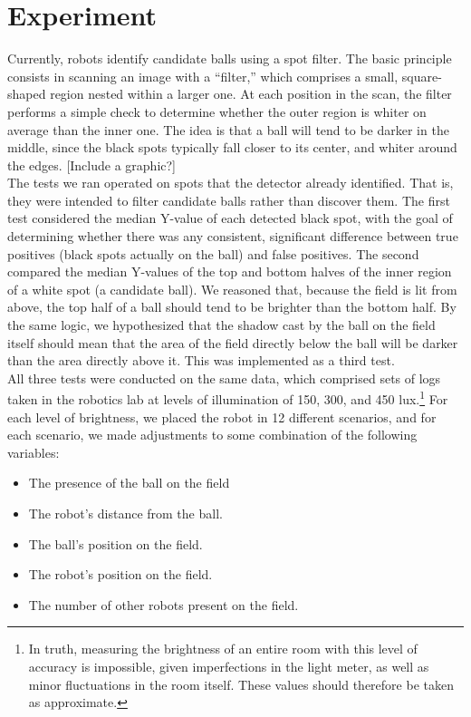 \documentclass[11pt, twocolumn]{article}
\begin{document}
\section{Experiment}
Currently, robots identify candidate balls using a spot filter. The basic principle consists in scanning an image with a ``filter,'' which comprises a small, square-shaped region nested within a larger one. At each position in the scan, the filter performs a simple check to determine whether the outer region is whiter on average than the inner one. The idea is that a ball will tend to be darker in the middle, since the black spots typically fall closer to its center, and whiter around the edges. [Include a graphic?] \\
The tests we ran operated on spots that the detector already identified. That is, they were intended to filter candidate balls rather than discover them. The first test considered the median Y-value of each detected black spot, with the goal of determining whether there was any consistent, significant difference between true positives (black spots actually on the ball) and false positives. The second compared the median Y-values of the top and bottom halves of the inner region of a white spot (a candidate ball). We reasoned that, because the field is lit from above, the top half of a ball should tend to be brighter than the bottom half. By the same logic, we hypothesized that the shadow cast by the ball on the field itself should mean that the area of the field directly below the ball will be darker than the area directly above it. This was implemented as a third test. \\
\indent All three tests were conducted on the same data, which comprised sets of logs taken in the robotics lab at levels of illumination of 150, 300, and 450 lux.\footnote{In truth, measuring the brightness of an entire room with this level of accuracy is impossible, given imperfections in the light meter, as well as minor fluctuations in the room itself. These values should therefore be taken as approximate.} For each level of brightness, we placed the robot in 12 different scenarios, and for each scenario, we made adjustments to some combination of the following variables:
\begin{itemize}
\item The presence of the ball on the field
\item The robot's distance from the ball.
\item The ball's position on the field.
\item The robot's position on the field.
\item The number of other robots present on the field.
\end{itemize}
\end{document}
